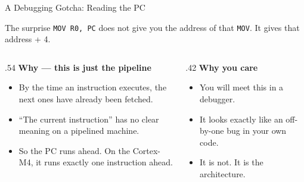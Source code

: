 \documentclass[9pt,aspectratio=169,xcolor=table]{beamer}
\begin{document}
\begin{frame}{A Debugging Gotcha: Reading the PC}
    \begin{block}{The surprise}
        \texttt{MOV R0, PC} does \alert{not} give you the address of that
        \texttt{MOV}. It gives that address \alert{+ 4}.
    \end{block}

    \vspace{2mm}
    \begin{columns}[T]
    \begin{column}{.54\textwidth}
        \textbf{Why --- this is just the pipeline}
        \begin{itemize}
            \item By the time an instruction executes, the next ones
                  have \alert{already been fetched}.
            \item ``The current instruction'' has no clear meaning on
                  a pipelined machine.
            \item So the PC runs ahead. On the Cortex-M4, it runs
                  exactly one instruction ahead.
        \end{itemize}
    \end{column}
    \begin{column}{.42\textwidth}
        \textbf{Why you care}
        \begin{itemize}
            \item You will meet this in a debugger.
            \item It looks exactly like an off-by-one bug in your own code.
            \item It is not. It is the architecture.
        \end{itemize}
    \end{column}
    \end{columns}
\end{frame}
\end{document}
